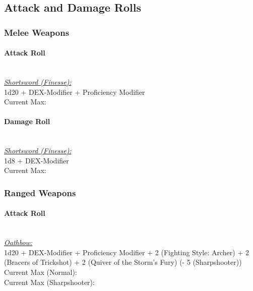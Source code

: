 \documentclass[letterpaper,openany,oneside,twocolumn]{book}
\begin{document}
\subsection*{Attack and Damage Rolls}
\subsubsection*{Melee Weapons}
\paragraph*{Attack Roll}\hfill\\
\underline{\textit{Shortsword (Finesse):}}\\
1d20 + DEX-Modifier + Proficiency Modifier\\
\indent Current Max: 
\paragraph*{Damage Roll}\hfill\\
\underline{\textit{Shortsword (Finesse):}}\\
1d8 + DEX-Modifier\\
\indent Current Max: 
\subsubsection*{Ranged Weapons}
\paragraph*{Attack Roll}\hfill\\
\underline{\textit{Oathbow:}}\\
1d20 + DEX-Modifier + Proficiency Modifier + 2 (Fighting Style: Archer) + 2 (Bracers of Trickshot) + 2 (Quiver of the Storm's Fury) (- 5 (Sharpshooter)) \\
\indent Current Max (Normal):  \\
\indent Current Max (Sharpshooter): 
\end{document}
